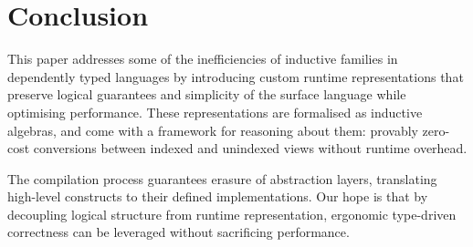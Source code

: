 
\section{Conclusion}

This paper addresses some of the inefficiencies of inductive families in
dependently typed languages by introducing custom runtime representations that
preserve logical guarantees and simplicity of the surface language while
optimising performance. These representations are formalised as inductive
algebras, and come with a framework for reasoning about them: provably zero-cost
conversions between indexed and unindexed views without runtime overhead.

The compilation process guarantees erasure of abstraction layers, translating
high-level constructs to their defined implementations. Our hope is that by
decoupling logical structure from runtime representation, ergonomic type-driven
correctness can be leveraged without sacrificing performance.
